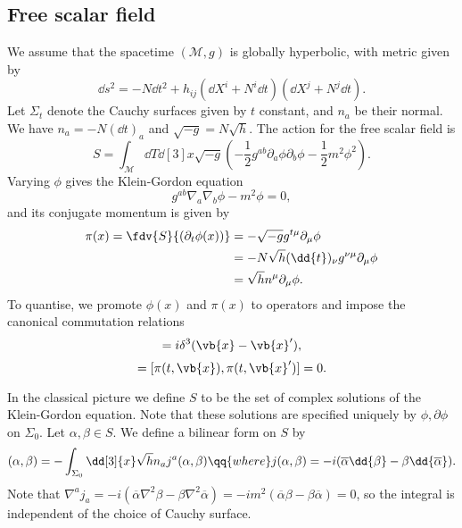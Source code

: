 \documentclass{jknotes}
\begin{document}
\subsection{Free scalar field}
We assume that the spacetime \((\mathcal{M},g)\) is globally hyperbolic, with metric given by
\begin{equation}
    \dd{s}^2 = -N\dd{t}^2 + h_{ij}(\dd{X}^i+N^i\dd{t})(\dd{X}^j+N^j\dd{t}).
\end{equation}
Let \(\Sigma_t\) denote the Cauchy surfaces given by \(t\) constant, and \(n_a\) be their normal. We have \(n_a = -N(\dd{t})_a\) and \(\sqrt{-g} = N\sqrt{h}\). The action for the free scalar field is
\begin{equation}
    S = \int_\mathcal{M} \dd{T}\dd[3]{x}\sqrt{-g}\left(-\frac{1}{2}g^{ab}\partial_a\phi\partial_b\phi-\frac{1}{2}m^2\phi^2\right).
\end{equation}
Varying \(\phi\) gives the Klein-Gordon equation
\begin{equation}
    g^{ab}\nabla_a\nabla_b\phi - m^2\phi = 0,
\end{equation}
and its conjugate momentum is given by
\begin{align}
    \pi(x) = \fdv{S}{(\partial_t\phi(x))}
    &= -\sqrt{-g}g^{t\mu}\partial_\mu\phi \\
    &= -N\sqrt{h}(\dd{t})_\nu g^{\nu\mu}\partial_\mu\phi \\
    &= \sqrt{h}n^\mu\partial_\mu\phi.
\end{align}
To quantise, we promote \(\phi(x)\) and \(\pi(x)\) to operators and impose the canonical commutation relations
\begin{equation}
    [\phi(t,\vb{x}),\pi(t,\vb{x}')] = i\delta^3(\vb{x}-\vb{x}'),
\end{equation}
\begin{equation}
    [\phi(t,\vb{x}),\phi(t,\vb{x}')] = [\pi(t,\vb{x}),\pi(t,\vb{x}')] = 0.
\end{equation}

In the classical picture we define \(S\) to be the set of complex solutions of the Klein-Gordon equation. Note that these solutions are specified uniquely by \(\phi,\partial\phi\) on \(\Sigma_0\). Let \(\alpha,\beta\in S\). We define a bilinear form on \(S\) by
\begin{equation}
    (\alpha,\beta) = -\int_{\Sigma_0}\dd[3]{x}\sqrt{h}n_aj^a(\alpha,\beta) \qq{where} j(\alpha,\beta) = -i (\overline{\alpha}\dd{\beta}-\beta\dd{\overline{\alpha}}).
\end{equation}
Note that \(\nabla^aj_a=-i(\overline{\alpha}\nabla^2\beta-\beta\nabla^2\overline{\alpha}) = -im^2(\overline{\alpha}\beta-\beta\overline{\alpha}) = 0\), so the integral is independent of the choice of Cauchy surface.
\end{document}
